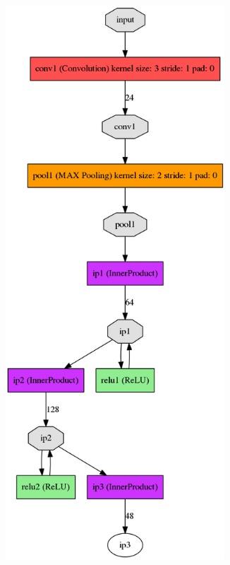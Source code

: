 \documentclass[twoside]{article}
\begin{document}
\begin{multicols}{2}
\begin{figure}
\begin{subfigure}[b]{0.42\textwidth}
	\includegraphics[width=0.9\textwidth]{images/4x4/minnd_dia_4x4}

\end{subfigure}
\end{figure}
\end{multicols}
\end{document}
